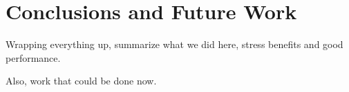 \section{Conclusions and Future Work}
Wrapping everything up, summarize what we did here, stress benefits and good performance.

Also, work that could be done now.

